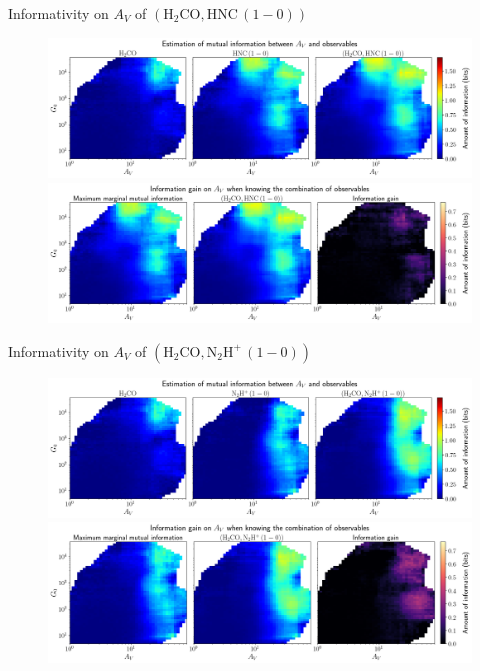 \documentclass{beamer}
\begin{document}
\begin{frame}{Informativity on $A_V$ of $\left(\mathrm{H_2CO},\mathrm{HNC\,(1-0)}\right)$}
    \begin{figure}
        \centering
        \includegraphics[width=0.95\linewidth]{../mi/av__h2co_hnc10_mi.png}
        \vfill
        \includegraphics[width=0.95\linewidth]{../mi/av__h2co_hnc10_mi_gain.png}
    \end{figure}
\end{frame}

\begin{frame}{Informativity on $A_V$ of $\left(\mathrm{H_2CO},\mathrm{N_2H^+\,(1-0)}\right)$}
    \begin{figure}
        \centering
        \includegraphics[width=0.95\linewidth]{../mi/av__h2co_n2hp10_mi.png}
        \vfill
        \includegraphics[width=0.95\linewidth]{../mi/av__h2co_n2hp10_mi_gain.png}
    \end{figure}
\end{frame}
\end{document}
